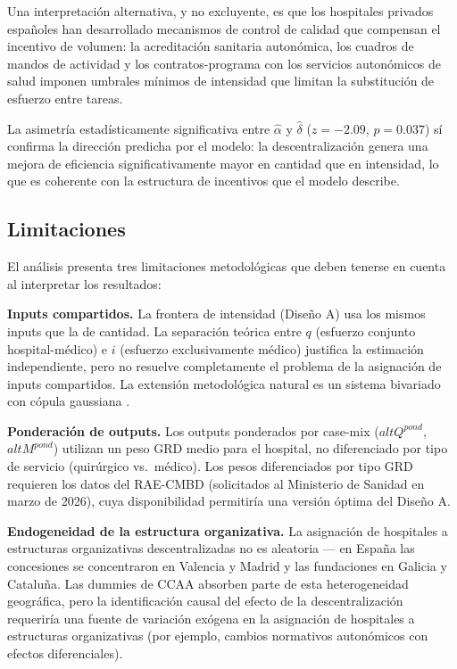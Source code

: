 \documentclass[12pt, a4paper]{article}
\begin{document}
Una interpretación alternativa, y no excluyente, es
que los hospitales privados españoles han desarrollado
mecanismos de control de calidad que compensan el
incentivo de volumen: la acreditación sanitaria
autonómica, los cuadros de mandos de actividad y los
contratos-programa con los servicios autonómicos de
salud imponen umbrales mínimos de intensidad que
limitan la substitución de esfuerzo entre tareas.

La asimetría estadísticamente significativa entre
$\hat{\alpha}$ y $\hat{\delta}$ ($z=-2.09$, $p=0.037$)
sí confirma la dirección predicha por el modelo: la
descentralización genera una mejora de eficiencia
significativamente mayor en cantidad que en intensidad,
lo que es coherente con la estructura de incentivos que
el modelo describe.

\subsection{Limitaciones}

El análisis presenta tres limitaciones metodológicas
que deben tenerse en cuenta al interpretar los
resultados:

\textbf{Inputs compartidos.} La frontera de intensidad
(Diseño A) usa los mismos inputs que la de cantidad.
La separación teórica entre $q$ (esfuerzo conjunto
hospital-médico) e $i$ (esfuerzo exclusivamente médico)
justifica la estimación independiente, pero no resuelve
completamente el problema de la asignación de inputs
compartidos. La extensión metodológica natural es un
sistema bivariado con cópula gaussiana
\citep{kumbhakar1997}.

\textbf{Ponderación de outputs.} Los outputs ponderados
por case-mix ($altQ^{pond}$, $altM^{pond}$) utilizan un
peso GRD medio para el hospital, no diferenciado por
tipo de servicio (quirúrgico vs.\ médico). Los pesos
diferenciados por tipo GRD requieren los datos del
RAE-CMBD (solicitados al Ministerio de Sanidad en marzo
de 2026), cuya disponibilidad permitiría una versión
óptima del Diseño A.

\textbf{Endogeneidad de la estructura organizativa.}
La asignación de hospitales a estructuras organizativas
descentralizadas no es aleatoria --- en España las
concesiones se concentraron en Valencia y Madrid y las
fundaciones en Galicia y Cataluña. Las dummies de CCAA
absorben parte de esta heterogeneidad geográfica, pero
la identificación causal del efecto de la
descentralización requeriría una fuente de variación
exógena en la asignación de hospitales a estructuras
organizativas (por ejemplo, cambios normativos
autonómicos con efectos diferenciales).
\end{document}
